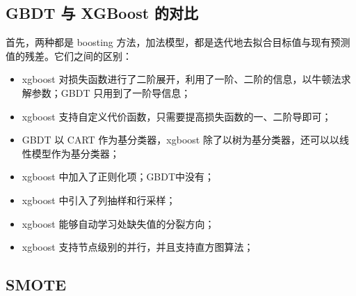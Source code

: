 \subsection{GBDT 与 XGBoost 的对比}
首先，两种都是 boosting 方法，加法模型，都是迭代地去拟合目标值与现有预测值的残差。它们之间的区别：
\begin{itemize}
	\item xgboost 对损失函数进行了二阶展开，利用了一阶、二阶的信息，以牛顿法求解参数；GBDT 只用到了一阶导信息；
	
	\item xgboost 支持自定义代价函数，只需要提高损失函数的一、二阶导即可；
	
	\item GBDT 以 CART 作为基分类器，xgboost 除了以树为基分类器，还可以以线性模型作为基分类器；
	
	\item xgboost 中加入了正则化项；GBDT中没有；
	
	\item xgboost 中引入了列抽样和行采样；
	
	\item xgboost 能够自动学习处缺失值的分裂方向；
	
	\item xgboost 支持节点级别的并行，并且支持直方图算法；
\end{itemize}

\subsection{SMOTE}